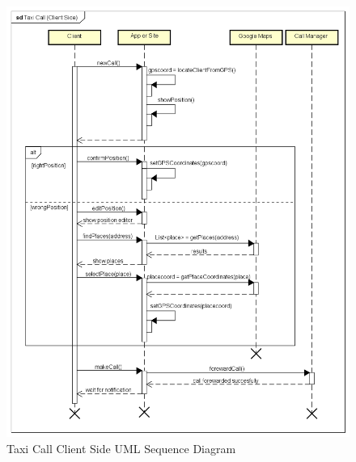 \documentclass[a4paper]{article}
\begin{document}
\begin{figure}[H]
\includegraphics[width=\sequenceWidth]{Sequence-TaxiCallClientSide}
\centering
\caption{Taxi Call Client Side UML Sequence Diagram}
\label{fig:sequencecallclientside}
\end{figure}
\end{document}
